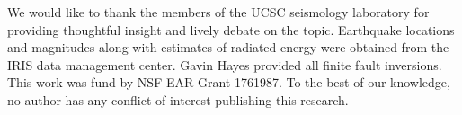 \documentclass[draft, jgrga]{agujournal2018}
\begin{document}
\acknowledgments
We would like to thank the members of the UCSC seismology laboratory for providing thoughtful insight and lively debate on the topic. Earthquake locations and magnitudes along with estimates of radiated energy were obtained from the IRIS data management center. Gavin Hayes provided all finite fault inversions. This work was fund by NSF-EAR Grant 1761987. To the best of our knowledge, no author has any conflict of interest publishing this research. 


\end{document}
